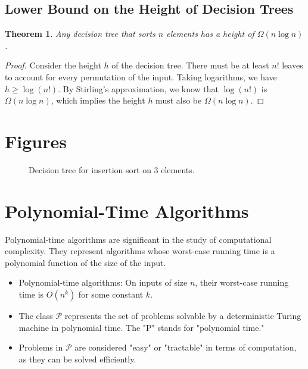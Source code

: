 \documentclass[12pt,openany]{book}
\newtheorem{theorem}{Theorem}[chapter]
\theoremstyle{definition}
\begin{document}
\subsection{Lower Bound on the Height of Decision Trees}
\begin{theorem}
	Any decision tree that sorts \( n \) elements has a height of \( \Omega(n \log n) \).
\end{theorem}

\begin{proof}
	Consider the height \( h \) of the decision tree. There must be at least \( n! \) leaves to account for every permutation of the input. Taking logarithms, we have \( h \geq \log(n!) \). By Stirling's approximation, we know that \( \log(n!) \) is \( \Omega(n \log n) \), which implies the height \( h \) must also be \( \Omega(n \log n) \).
\end{proof}

\section{Figures}
\begin{figure}[ht]
	\centering
	\caption{Decision tree for insertion sort on 3 elements.}
\end{figure}

\section{Polynomial-Time Algorithms}
Polynomial-time algorithms are significant in the study of computational complexity. They represent algorithms whose worst-case running time is a polynomial function of the size of the input.

\begin{itemize}
	\item Polynomial-time algorithms: On inputs of size \( n \), their worst-case running time is \( O(n^k) \) for some constant \( k \).
	\item The class \( \mathcal{P} \) represents the set of problems solvable by a deterministic Turing machine in polynomial time. The "P" stands for "polynomial time."
	\item Problems in \( \mathcal{P} \) are considered "easy" or "tractable" in terms of computation, as they can be solved efficiently.
\end{itemize}
\end{document}
